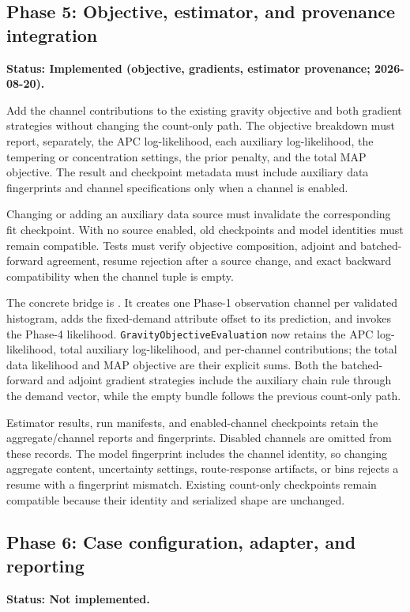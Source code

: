 \subsection{Phase 5: Objective, estimator, and provenance integration}
\label{sec:gps-implementation-phase-5}
\textbf{Status: Implemented (objective, gradients, estimator provenance; 2026-08-20).}

Add the channel contributions to the existing gravity objective and both
gradient strategies without changing the count-only path.  The objective
breakdown must report, separately, the APC log-likelihood, each auxiliary
log-likelihood, the tempering or concentration settings, the prior penalty,
and the total MAP objective.  The result and checkpoint metadata must include
auxiliary data fingerprints and channel specifications only when a channel is
enabled.

Changing or adding an auxiliary data source must invalidate the corresponding
fit checkpoint.  With no source enabled, old checkpoints and model identities
must remain compatible.  Tests must verify objective composition, adjoint and
batched-forward agreement, resume rejection after a source change, and exact
backward compatibility when the channel tuple is empty.

The concrete bridge is
.
It creates one Phase-1 observation channel per validated histogram, adds the
fixed-demand attribute offset to its prediction, and invokes the Phase-4
likelihood.  \texttt{GravityObjectiveEvaluation} now retains the APC
log-likelihood, total auxiliary log-likelihood, and per-channel contributions;
the total data likelihood and MAP objective are their explicit sums.  Both
the batched-forward and adjoint gradient strategies include the auxiliary
chain rule through the demand vector, while the empty bundle follows the
previous count-only path.

Estimator results, run manifests, and enabled-channel checkpoints retain the
aggregate/channel reports and fingerprints.  Disabled channels are omitted
from these records.  The model fingerprint includes the channel identity, so
changing aggregate content, uncertainty settings, route-response artifacts,
or bins rejects a resume with a fingerprint mismatch.  Existing count-only
checkpoints remain compatible because their identity and serialized shape are
unchanged.

\subsection{Phase 6: Case configuration, adapter, and reporting}
\label{sec:gps-implementation-phase-6}
\textbf{Status: Not implemented.}

